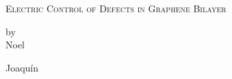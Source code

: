 \begin{titlepage}

\begin{center}

\begingroup \linespread{1,75} \selectfont 
\textsc{\LARGE Electric Control of Defects in Graphene Bilayer}\\[1,5cm]
\endgroup


by\\[0,5cm]
Noel\\[2,5cm]


\end{center}

Joaquín

\vfill

\end{titlepage}

